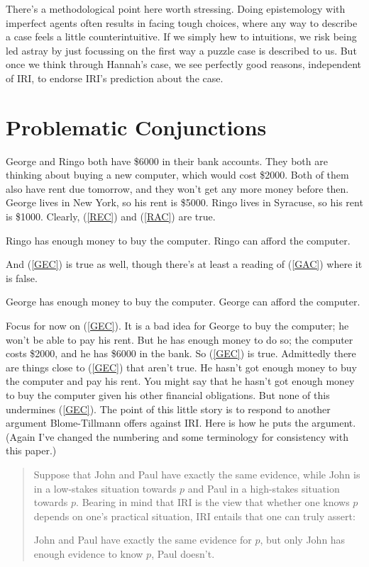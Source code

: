 \documentclass[11pt,oneside]{book}
\begin{document}
There's a methodological point here worth stressing. Doing epistemology with imperfect agents often results in facing tough choices, where any way to describe a case feels a little counterintuitive. If we simply hew to intuitions, we risk being led astray by just focussing on the first way a puzzle case is described to us. But once we think through Hannah's case, we see perfectly good reasons, independent of IRI, to endorse IRI's prediction about the case.

\section{Problematic Conjunctions}
 George and Ringo both have \$6000 in their bank accounts. They both are thinking about buying a new computer, which would cost \$2000. Both of them also have rent due tomorrow, and they won't get any more money before then. George lives in New York, so his rent is \$5000. Ringo lives in Syracuse, so his rent is \$1000. Clearly, (\ref{REC}) and (\ref{RAC}) are true.

\begin{exe}
\ex\label{REC} Ringo has enough money to buy the computer.
\ex\label{RAC} Ringo can afford the computer.
\end{exe}

\noindent And (\ref{GEC}) is true as well, though there's at least a reading of (\ref{GAC}) where it is false.

\begin{exe}
\ex\label{GEC} George has enough money to buy the computer.
\ex\label{GAC} George can afford the computer.
\end{exe}

\noindent Focus for now on (\ref{GEC}). It is a bad idea for George to buy the computer; he won't be able to pay his rent. But he has enough money to do so; the computer costs \$2000, and he has \$6000 in the bank. So (\ref{GEC}) is true. Admittedly there are things close to (\ref{GEC}) that aren't true. He hasn't got enough money to buy the computer and pay his rent. You might say that he hasn't got enough money to buy the computer given his other financial obligations. But none of this undermines (\ref{GEC}). The point of this little story is to respond to another argument Blome-Tillmann offers against IRI. Here is how he puts the argument. (Again I've changed the numbering and some terminology for consistency with this paper.)

\begin{quote}
\noindent Suppose that John and Paul have exactly the same evidence, while John is in a low-stakes situation towards $p$ and Paul in a high-stakes situation towards $p$. Bearing in mind that IRI is the view that whether one knows $p$ depends on one's practical situation, IRI entails that one can truly assert:

\begin{exe}
\ex\label{SameEv} John and Paul have exactly the same evidence for $p$, but only John has enough evidence to know $p$, Paul doesn't.
\end{exe}
\end{quote}
\end{document}
